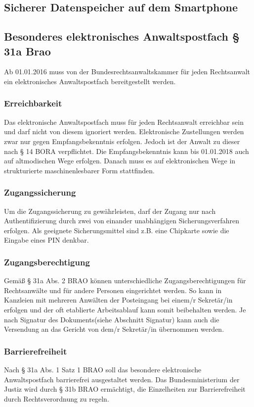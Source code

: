 \subsection*{Sicherer Datenspeicher auf dem Smartphone}
\subsection{Besonderes elektronisches Anwaltspostfach § 31a Brao}
Ab 01.01.2016 muss von der Bundesrechtsanwaltskammer für jeden Rechtsanwalt ein elektronisches Anwaltspostfach bereitgestellt werden.
\subsubsection*{Erreichbarkeit}
Das elektronische Anwaltspostfach muss für jeden Rechtsanwalt erreichbar sein und darf nicht von diesem ignoriert werden. Elektronische Zustellungen werden zwar nur gegen Empfangsbekenntnis erfolgen. Jedoch ist der Anwalt zu dieser nach § 14 BORA verpflichtet. Die Empfangsbekenntnis kann bis 01.01.2018 auch auf altmodischen Wege erfolgen. Danach muss es auf elektronischen Wege in strukturierte maschinenlesbarer Form stattfinden.
\subsubsection*{Zugangssicherung}
Um die Zugangssicherung zu gewährleisten, darf der Zugang nur nach Authentifizierung durch zwei von einander unabhängigen Sicherungsverfahren erfolgen. Als geeignete Sicherungsmittel sind z.B. eine Chipkarte sowie die Eingabe eines PIN denkbar.  
\subsubsection*{Zugangsberechtigung}
Gemäß § 31a Abs. 2 BRAO können unterschiedliche Zugangsberechtigungen für Rechtsanwälte und für andere Personen eingerichtet werden. So kann in Kanzleien mit mehreren Anwälten der Posteingang bei einem/r Sekretär/in erfolgen und der oft etablierte Arbeitsablauf kann somit beibehalten werden.  Je nach Signatur des Dokuments(siehe Abschnitt Signatur) kann auch die Versendung an das Gericht von dem/r Sekretär/in übernommen werden.

\subsubsection*{Barrierefreiheit}
Nach § 31a Abs. 1 Satz 1 BRAO soll das besondere elektronische Anwaltspostfach barrierefrei ausgestaltet werden. Das Bundesministerium der Justiz wird durch § 31b BRAO ermächtigt, die Einzelheiten zur Barrierefreiheit durch Rechtsverordnung zu regeln.
